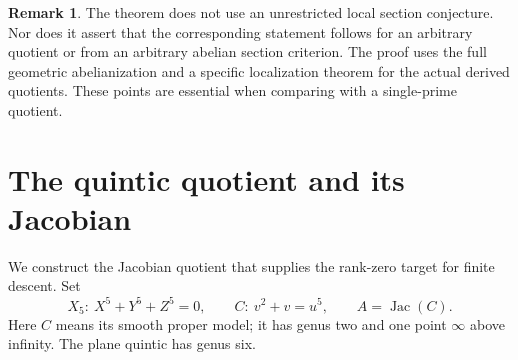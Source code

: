 \documentclass[11pt]{article}
\numberwithin{equation}{section}
\newcommand{\Jac}{\operatorname{Jac}}
\theoremstyle{definition}
\newtheorem{remark}[theorem]{Remark}
\begin{document}
\begin{remark}\label{rem:transfer-scope}
The theorem does not use an unrestricted local section conjecture.
Nor does it assert that the corresponding statement follows for an
arbitrary quotient or from an arbitrary abelian section criterion.
The proof uses the full geometric abelianization and a specific
localization theorem for the actual derived quotients. These points
are essential when comparing with a single-prime quotient.
\end{remark}










\section{The quintic quotient and its Jacobian}

We construct the Jacobian quotient that supplies the rank-zero
target for finite descent. Set
\[
X_5:\ X^5+Y^5+Z^5=0,
\qquad C:\ v^2+v=u^5,
\qquad A=\Jac(C).
\]
Here $C$ means its smooth proper model; it has genus two and one point
$\infty$ above infinity. The plane quintic has genus six.
\end{document}
